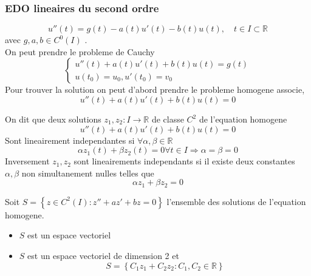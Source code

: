 \documentclass[../main.tex]{subfiles}
\begin{document}
\subsubsection{EDO lineaires du second ordre}
\[ 
	u'' ( t) = g( t) - a( t) u'( t) - b( t) u( t) , \quad t \in I \subset \mathbb{R}
\]
avec $g,a,b\in C^{0}( I) $ .\\
On peut prendre le probleme de Cauchy 
\[ 
\begin{cases}
	u''( t) + a( t) u'( t) + b( t) u( t) = g( t) \\
	u( t_0) = u_0, u'( t_0) =v_0
\end{cases}
\]
Pour trouver la solution on peut d'abord prendre le probleme homogene associe, 
\[ 
	u''( t) + a( t) u'( t) + b( t) u( t) =0
\]
\begin{defn}
On dit que deux solutions $z_1, z_2: I\to \mathbb{R}$ de classe $C^{2}$ de l'equation homogene
\[ 
	u''( t) + a( t) u'( t) + b( t) u( t) =0
\]
Sont lineairement independantes si $\forall \alpha, \beta\in \mathbb{R}$ 
\[ 
	\alpha z_1( t) + \beta z_2( t) = 0 \forall t \in I \Rightarrow \alpha = \beta =0
\]
Inversement  $z_1, z_2$ sont lineairements independants si il existe deux constantes $\alpha, \beta$ non simultanement nulles telles que
\[ 
\alpha z_1 + \beta z_2 = 0
\]
\end{defn}
Soit $S = \left\{ z \in C^{2}( I) : z'' + az' + bz = 0 \right\} $ l'ensemble des solutions de l'equation homogene.
\begin{itemize}
\item $S$ est un espace vectoriel
\item $S$ est un espace vectoriel de dimension 2 et
	\[ 
	S = \left\{ C_1 z_1 + C_2 z_2: C_1, C_2 \in \mathbb{R} \right\} 
	\]
	
\end{itemize}	
\end{document}
